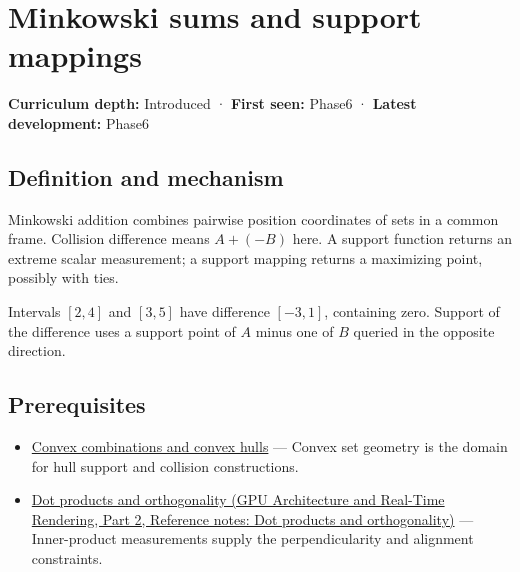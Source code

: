 \hypertarget{appendix-215ac7099a82}{}\label{referencestart:appendix-215ac7099a82}
\section{Minkowski sums and support mappings}\label{appendix-215ac7099a82-minkowski-sums-and-support-mappings}

\hypertarget{appendix-215ac7099a82-minkowski-sums-and-support-mappings}{}

\textbf{Curriculum depth:} Introduced · \textbf{First seen:} Phase6 · \textbf{Latest development:} Phase6

\begin{allmightroledefinition}

\subsection{Definition and mechanism}\label{appendix-215ac7099a82-definition-and-mechanism}

\hypertarget{appendix-215ac7099a82-definition-and-mechanism}{}

Minkowski addition combines pairwise position coordinates of sets in a common frame. Collision difference means \(A+(-B)\) here. A support function returns an extreme scalar measurement; a support mapping returns a maximizing point, possibly with ties.

\end{allmightroledefinition}

Intervals \([2,4]\) and \([3,5]\) have difference \([-3,1]\), containing zero. Support of the difference uses a support point of \(A\) minus one of \(B\) queried in the opposite direction.

\subsection{Prerequisites}\label{appendix-215ac7099a82-prerequisites}

\hypertarget{appendix-215ac7099a82-prerequisites}{}

\begin{itemize}
\tightlist
\item
  \hyperref[appendix-0026ec42c9d5]{Convex combinations and convex hulls} --- Convex set geometry is the domain for hull support and collision constructions.
\item
  \href{../06-GPU-Architecture-and-Real-Time-Rendering-P02/main.pdf\#appendix-8bc4e8fc547c}{Dot products and orthogonality (GPU Architecture and Real-Time Rendering, Part 2, Reference notes: Dot products and orthogonality)} --- Inner-product measurements supply the perpendicularity and alignment constraints.
\end{itemize}


